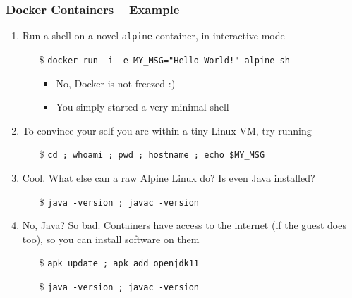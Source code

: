 \documentclass[presentation]{beamer}\mode<presentation>{\usetheme{AMSBolognaFC}}
\begin{document}
\begin{frame}[allowframebreaks]
\frametitle{Docker Containers -- Example}

    \begin{enumerate}
        \item Run a shell on a novel \texttt{alpine} container, in interactive mode
        \begin{itemize}
            \item[\$] \texttt{docker run -i -e MY\_MSG="Hello World!" alpine sh}
            \begin{itemize}
                \item No, Docker is not freezed :)
                \item You simply started a \alert{very minimal} shell
            \end{itemize}
        \end{itemize}

        \vfill

        \item To convince your self you are within a tiny Linux VM, try running
        \begin{itemize}
            \item[\$] \texttt{cd ; whoami ; pwd ; hostname ; echo \$MY\_MSG}
        \end{itemize}

        \vfill

        \item Cool. What else can a raw Alpine Linux do? Is even Java installed?
        \begin{itemize}
            \item[\$] \texttt{java -version ; javac -version}
        \end{itemize}

        \vfill

        \item No, Java? So bad. Containers have access to the internet (if the guest does too), so you can install software on them
        \begin{itemize}
            \item[\$] \texttt{apk update ; apk add openjdk11} 
            \item[\$] \texttt{java -version ; javac -version}
        \end{itemize}


\end{enumerate}
\end{frame}
\end{document}
